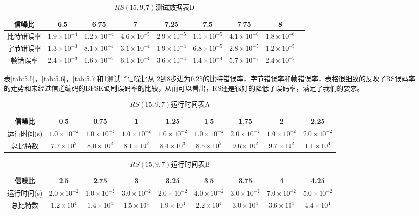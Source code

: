 \begin{table}[htpb]
   \caption{$RS(15,9,7)$测试数据表D}
  \label{tab:5.8}
  \centering
  \wuhao
  \begin{tabular}{|c||c|c|c|c|c|c|c|c|}
    \hline
    信噪比&6.5&6.75&7&7.25&7.5&7.75&8\\
    \hline
    \hline
    比特错误率&$1.9\times 10^{-4}$&$1.2\times 10^{-4}$&$4.6\times
    10^{-5}$&$2.9\times 10^{-5}$&$1.1\times 10^{-5}$&$4.1\times
    10^{-6}$&$1.8\times 10^{-6}$\\
    字节错误率&$1.3\times 10^{-3}$&$8.1\times 10^{-4}$&$3.1\times
    10^{-4}$&$1.9\times 10^{-4}$&$6.8\times 10^{-5}$&$2.8\times
    10^{-5}$&$1.2\times 10^{-5}$\\
    帧错误率&$2.4\times 10^{-3}$&$1.6\times 10^{-3}$&$6.1\times
    10^{-4}$&$3.6\times 10^{-4}$&$1.4\times 10^{-4}$&$5.7\times
    10^{-5}$&$2.4\times 10^{-5}$\\
    \hline
  \end{tabular}
 
\end{table}
表\ref{tab:5.5}，\ref{tab:5.6}，\ref{tab:5.7}和\ref{tab:5.8}测试了信噪比从
2到8步进为0.25的比特错误率，字节错误率和帧错误率，表格很细致的反映了RS误码率的走势和未经过信道编码的BPSK调制误码率的比较，从而可以看出，RS还是很好的降低了误码率，满足了我们的要求。
\begin{table}[hpb]
    \caption{$RS(15,9,7)$运行时间表A}
  \label{tab:5.9}
  \centering
  \wuhao
  \begin{tabular}{|c||c|c|c|c|c|c|c|c|}
    \hline
    信噪比&0.5&0.75&1&1.25&1.5&1.75&2&2.25\\
    \hline
    \hline
    运行时间(s)&$1.0\times 10^{-2}$&$1.0\times 10^{-2}$&$1.0\times
    10^{-2}$&$1.0\times 10^{-2}$&$1.0\times 10^{-2}$&$2.0\times
    10^{-2}$&$1.0\times 10^{-2}$&$2.0\times 10^{-2}$\\
    总比特数&$7.7\times 10^3$&$8.0\times 10^3$&$8.1\times
    10^3$&$8.4\times 10^3$&$8.5\times 10^3$&$9.6\times 10^3$&$9.7\times
    10^3$&$1.1\times 10^4$\\
    \hline
  \end{tabular}

\end{table}

\begin{table}[htpb]
    \caption{$RS(15,9,7)$运行时间表B}
  \label{tab:5.10}
  \centering
  \wuhao
  \begin{tabular}{|c||c|c|c|c|c|c|c|c|}
    \hline
    信噪比&2.5&2.75&3&3.25&3.5&3.75&4&4.25\\
    \hline
    \hline
    运行时间(s)&$2.0\times 10^{-2}$&$1.0\times 10^{-2}$&$3.0\times
    10^{-2}$&$2.0\times 10^{-2}$&$4.0\times 10^{-2}$&$3.0\times
    10^{-2}$&$7.0\times 10^{-2}$&$5.0\times 10^{-2}$\\
    总比特数&$1.2\times 10^4$&$1.4\times 10^4$&$1.5\times
    10^4$&$1.9\times 10^4$&$2.2\times 10^4$&$3.0\times 10^4$&$3.6\times
    10^4$&$4.4\times 10^4$\\
    \hline
  \end{tabular}

\end{table}

